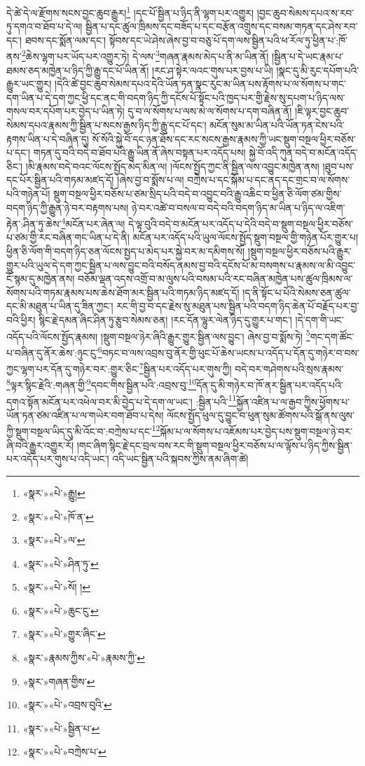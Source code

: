 དེ་ཚེ་དེ་ལ་རྫོགས་སངས་བྱང་ཆུབ་རྒྱུར།\footnote{«སྣར་»«པེ་»རྒྱུ།} །དང་པོ་སྦྱིན་པ་ཉིད་ནི་ལྷག་པར་འགྱུར། །བྱང་ཆུབ་སེམས་དཔའ་ས་རབ་ཏུ་དགའ་བ་ཐོབ་པ་དེ་ལ། སྦྱིན་པ་དང་ཚུལ་ཁྲིམས་དང་བཟོད་པ་དང་བརྩོན་འགྲུས་དང་བསམ་གཏན་དང་ཤེས་རབ་དང་། ཐབས་དང་སྨོན་ལམ་དང་། སྟོབས་དང་ཡེ་ཤེས་ཞེས་བྱ་བ་བཅུ་པོ་དག་ལས་སྦྱིན་པའི་ཕ་རོལ་ཏུ་ཕྱིན་པ་:ཁོ་ནས་\footnote{«སྣར་»«པེ་»ཁོ་ན་}ཆེས་ལྷག་པར་ཡོད་པར་འགྱུར་ཏེ། དེ་ལས་\footnote{«སྣར་»«པེ་»ལ་}གཞན་རྣམས་མེད་པ་ནི་མ་ཡིན་ནོ། །སྦྱིན་པ་དེ་ཡང་རྣམ་པ་ཐམས་ཅད་མཁྱེན་པ་ཉིད་ཀྱི་རྒྱུ་དང་པོ་ཡིན་ནོ། །རང་ཤ་སྟེར་ལའང་གུས་པར་བྱས་པ་ཡི། །སྣང་དུ་མི་རུང་དཔོག་པའི་རྒྱུར་ཡང་གྱུར། །དེའི་ཚེ་བྱང་ཆུབ་སེམས་དཔའ་དེའི་ཡོན་ཏན་སྣང་རུང་མ་ཡིན་པས་རྟོགས་པ་ལ་སོགས་པ་གང་དག་ཡིན་པ་དེ་དག་ཀྱང་ཕྱི་དང་ནང་གི་བདག་ཉིད་ཀྱི་དངོས་པོ་སྟོང་པའི་ཁྱད་པར་གྱི་རྗེས་སུ་དཔག་པ་ཉིད་ལས་གསལ་བར་དཔོག་པར་བྱེད་པ་ཡིན་ཏེ། དུ་བ་ལ་སོགས་པ་ལས་མེ་ལ་སོགས་པ་དག་བཞིན་ནོ། །ཇི་ལྟར་བྱང་ཆུབ་སེམས་དཔའ་རྣམས་ཀྱི་སྦྱིན་པ་སངས་རྒྱས་ཉིད་ཀྱི་རྒྱུ་དང་པོ་དང་། མངོན་སུམ་མ་ཡིན་པའི་ཡོན་ཏན་ངེས་པའི་རྟགས་ཡིན་པ་དེ་བཞིན་དུ། སོ་སོའི་སྐྱེ་བོ་དང་ཉན་ཐོས་དང་རང་སངས་རྒྱས་རྣམས་ཀྱི་ཡང་སྡུག་བསྔལ་ཕྱིར་བཅོས་པ་དང་། གཏན་དུ་བའི་བདེ་བ་ཐོབ་པའི་རྒྱུ་ཡིན་ནོ་ཞེས་བསྟན་པར་འདོད་པས། སྐྱེ་བོ་འདི་ཀུན་བདེ་བ་མངོན་འདོད་ཅིང་། །མི་རྣམས་བདེ་བའང་ལོངས་སྤྱོད་མེད་མིན་ལ། །ལོངས་སྤྱོད་ཀྱང་ནི་སྦྱིན་ལས་འབྱུང་མཁྱེན་ནས། །ཐུབ་པས་དང་པོར་སྦྱིན་པའི་གཏམ་མཛད་དོ། །ཞེས་བྱ་བ་སྨོས་པ་ལ། བཀྲེས་པ་དང་སྐོམ་པ་དང་ནད་དང་གྲང་བ་ལ་སོགས་པའི་གཉེན་པོ། སྡུག་བསྔལ་ཕྱིར་བཅོས་པ་ཙམ་སྲིད་པའི་བདེ་བ་འབྱུང་བའི་རྒྱུ་འཆིང་བ་ཕྱིན་ཅི་ལོག་ཙམ་གྱིས་བདག་ཉིད་ཀྱི་རྒྱུན་ཉེ་བར་བརྟགས་པས། ཉེ་བར་འཚེ་བ་བསལ་བ་བདེ་བའི་བདག་ཉིད་མ་ཡིན་པ་ཉིད་ལ་འཇིག་རྟེན་:ཤིན་ཏུ་ཆེས་\footnote{«སྣར་»«པེ་»ཤིན་ཏུ་}མངོན་པར་ཞེན་ལ། དེ་ལྟ་བུའི་བདེ་བ་མངོན་པར་འདོད་པ་དེའི་བདེ་བ་སྡུག་བསྔལ་ཕྱིར་བཅོས་པ་ཙམ་གྱི་རང་བཞིན་གང་ཡིན་པ་དེ་ནི། མངོན་པར་འདོད་པའི་ཡུལ་ལོངས་སྤྱོད་སྡུག་བསྔལ་གྱི་གཉེན་པོར་གྱུར་པ། ཕྱིན་ཅི་ལོག་གི་བདག་ཉིད་ཅན་ལོངས་སྤྱད་པ་མེད་པར་སྐྱེ་བར་མ་དམིགས་སོ། །སྡུག་བསྔལ་ཕྱིར་བཅོས་པའི་རྒྱུར་གྱུར་པའི་ཡུལ་དེ་དག་ཀྱང་སྦྱིན་པ་ལས་བྱུང་བའི་བསོད་ནམས་བྱ་བའི་དངོས་པོ་མ་བསགས་པ་རྣམས་ལ་མི་འབྱུང་ངོ་སྙམ་དུ་མཁྱེན་ནས། བཅོམ་ལྡན་འདས་འགྲོ་བ་མ་ལུས་པའི་བསམ་པའི་རང་བཞིན་མཁྱེན་པས་ཚུལ་ཁྲིམས་ལ་སོགས་པའི་གཏམ་རྣམས་པས་ཆེས་ཐོག་མར་སྦྱིན་པའི་གཏམ་ཉིད་མཛད་དོ། །ད་ནི་སྟོང་པ་པོའི་སེམས་ཅན་ཚུལ་དང་མི་མཐུན་པ་ཡིན་དུ་ཟིན་ཀྱང་། རང་གི་བྱ་བ་དང་རྗེས་སུ་མཐུན་པས་སྦྱིན་པའི་བདག་ཉིད་ཆེན་པོ་བརྗོད་པར་བྱ་བའི་ཕྱིར། སྙིང་རྗེ་དམན་ཞིང་ཤིན་ཏུ་རྩུབ་སེམས་ཅན། །རང་དོན་ལྷུར་ལེན་ཉིད་དུ་གྱུར་པ་གང་། །དེ་དག་གི་ཡང་འདོད་པའི་ལོངས་སྤྱོད་རྣམས། །སྡུག་བསྔལ་ཉེར་ཞིའི་རྒྱུར་གྱུར་སྦྱིན་ལས་བྱུང་། ཞེས་བྱ་བ་སྨོས་ཏེ། \footnote{«སྣར་»«པེ་»སོ། ། }གང་དག་ཚོང་པ་བཞིན་དུ་ནོར་ཆེས་:ཉུང་ངུ་\footnote{«སྣར་»«པེ་»ཆུང་ངུ་}བཏང་བ་ལས་འབྲས་བུ་ནོར་གྱི་ཕུང་པོ་ཆེས་ཡངས་པ་འདོད་པ་དོན་དུ་གཉེར་བ་བས་ཀྱང་ལྷག་པར་དོན་དུ་གཉེར་བར་:གྱུར་ཅིང་\footnote{«སྣར་»«པེ་»གྱུར་ཞིང་}སྦྱིན་པར་འདོད་པར་གུས་ཀྱི། བདེ་བར་གཤེགས་པའི་སྲས་རྣམས་\footnote{«སྣར་»རྣམས་ཀྱིས་«པེ་»རྣམས་ཀྱི་}ལྟར་སྙིང་རྗེའི་:གཞན་གྱི་\footnote{«སྣར་»གཞན་གྱིས་}དབང་གིས་སྦྱིན་པའི་:འབྲས་བུ་\footnote{«སྣར་»«པེ་»འབྲས་བུའི་}དོན་དུ་མི་གཉེར་བ་ཁོ་ནར་སྦྱིན་པར་འདོད་པའི་དགའ་སྟོན་མངོན་པར་འཕེལ་བར་མི་བྱེད་པ་དེ་དག་ལ་ཡང་། :སྦྱིན་པའི་\footnote{«སྣར་»«པེ་»སྦྱིན་པ་}སྐྱོན་འཛིན་པ་ལ་རྒྱབ་ཀྱིས་ཕྱོགས་པ་ཡོན་ཏན་ཙམ་འཛིན་པ་ལ་གཡེར་བག་ཐོབ་པ་དེས། ལོངས་སྤྱོད་ཕུལ་དུ་བྱུང་བ་ཕུན་སུམ་ཚོགས་པའི་སྒོ་ནས་ལུས་ཀྱི་སྡུག་བསྔལ་ཡིད་དུ་མི་འོང་བ་:བཀྲེས་པ་དང་\footnote{«སྣར་»«པེ་»བཀྲེས་པ་}སྐོམ་པ་ལ་སོགས་པ་འཇོམས་པར་བྱེད་པས་སྡུག་བསྔལ་ཉེ་བར་ཞི་བའི་རྒྱུར་འགྱུར་རོ། །གང་ཞིག་སྙིང་རྗེ་དང་བྲལ་བས་རང་གི་སྡུག་བསྔལ་ཕྱིར་བཅོས་པ་ལ་ལྟོས་པ་ཉིད་ཀྱིས་སྦྱིན་པར་འདོད་པར་གུས་པ་འདི་ཡང་། འདི་ཡང་སྦྱིན་པའི་སྐབས་ཀྱིས་ནམ་ཞིག་ཚེ། 